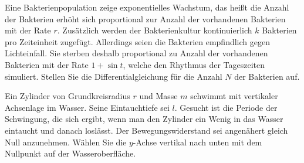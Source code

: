 \begin{atiTask}[
  title = Aufstellen von Differentialgleichungen
]
  \begin{atiSubtasks}
    \item{
      Eine Bakterienpopulation zeige exponentielles Wachstum, das heißt die Anzahl der Bakterien erhöht sich proportional zur Anzahl der vorhandenen Bakterien mit der Rate $r$.
      Zusätzlich werden der Bakterienkultur kontinuierlich $k$ Bakterien pro Zeiteinheit zugefügt.
      Allerdings seien die Bakterien empfindlich gegen Lichteinfall.
      Sie sterben deshalb proportional zu Anzahl der vorhandenen Bakterien mit der Rate $1+\sin t$, welche den Rhythmus der Tageszeiten simuliert.
      Stellen Sie die Differentialgleichung für die Anzahl $N$ der Bakterien auf.
    }
    \item{
      Ein Zylinder von Grundkreisradius $r$ und Masse $m$ schwimmt mit vertikaler Achsenlage im Wasser.
      Seine Eintauchtiefe sei $l$.
      Gesucht ist die Periode der Schwingung, die sich ergibt, wenn man den Zylinder ein Wenig in das Wasser eintaucht und danach loslässt.
      Der Bewegungswiderstand sei angenähert gleich Null anzunehmen.
      Wählen Sie die $y$-Achse vertikal nach unten mit dem Nullpunkt auf der Wasseroberfläche.
    }
  \end{atiSubtasks}
\end{atiTask}